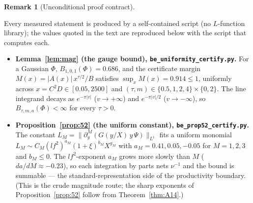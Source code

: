 \documentclass[11pt]{article}
\theoremstyle{definition}
\newtheorem{remark}[theorem]{Remark}
\begin{document}
\begin{remark}[Unconditional proof contract]
\begin{enumerate}
Every measured statement is produced by a self-contained script (no $L$-function library); the values
quoted in the text are reproduced below with the script that computes each.

\begin{itemize}
\item \textbf{Lemma~\ref{lem:mag} (the gauge bound), \texttt{be\_uniformity\_certify.py}.} For a
Gaussian $\Phi$, $B_{1,0,1}(\Phi)=0.686$, and the certificate margin
$M(x)=|A(x)|\,x^{\tau/2}/B$ satisfies $\sup_x M(x)=0.914\le1$, uniformly across $x=C^2D\in[0.05,2500]$
and $(\tau,m)\in\{0.5,1,2,4\}\times\{0,2\}$. The line integrand decays as $e^{-\pi|v|}$ ($v\to+\infty$)
and $e^{-\pi|v|/2}$ ($v\to-\infty$), so $B_{\tau,m,a}(\Phi)<\infty$ for every $\tau>0$.

\item \textbf{Proposition~\ref{prop:52} (the uniform constant), \texttt{be\_prop52\_certify.py}.} The
constant $L_M=\|\partial_y^M(G(y/X)\,y\,\Psi)\|_{L^1}$ fits a uniform monomial
$L_M\sim C_M(lf^2)^{a_M}(1+\xi)^{b_M}X^{g_M}$ with $a_M=0.41,0.05,-0.05$ for $M=1,2,3$ and $b_M\le0$.
The $lf^2$-exponent $a_M$ grows more slowly than $M$ ($da/dM\approx-0.23$), so each integration by
parts nets $\nu^{-1}$ and the bound is summable --- the standard-representation side of the
productivity boundary. (This is the crude magnitude route; the sharp exponents of
Proposition~\ref{prop:52} follow from Theorem~\ref{thm:A14}.)


\end{itemize}
\end{enumerate}
\end{remark}
\end{document}
